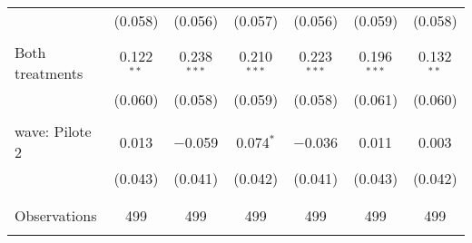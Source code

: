 \begin{tabular}{@{\extracolsep{5pt}}lcccccc}
  & (0.058) & (0.056) & (0.057) & (0.056) & (0.059) & (0.058) \\ 
  & & & & & & \\ 
 Both treatments & 0.122$^{**}$ & 0.238$^{***}$ & 0.210$^{***}$ & 0.223$^{***}$ & 0.196$^{***}$ & 0.132$^{**}$ \\ 
  & (0.060) & (0.058) & (0.059) & (0.058) & (0.061) & (0.060) \\ 
  & & & & & & \\ 
 wave: Pilote 2 & 0.013 & $-$0.059 & 0.074$^{*}$ & $-$0.036 & 0.011 & 0.003 \\ 
  & (0.043) & (0.041) & (0.042) & (0.041) & (0.043) & (0.042) \\ 
  & & & & & & \\ 
\hline \\[-1.8ex] 

Observations & 499 & 499 & 499 & 499 & 499 & 499 \\ 
\hline 
\hline \\[-1.8ex] 
\end{tabular} 
